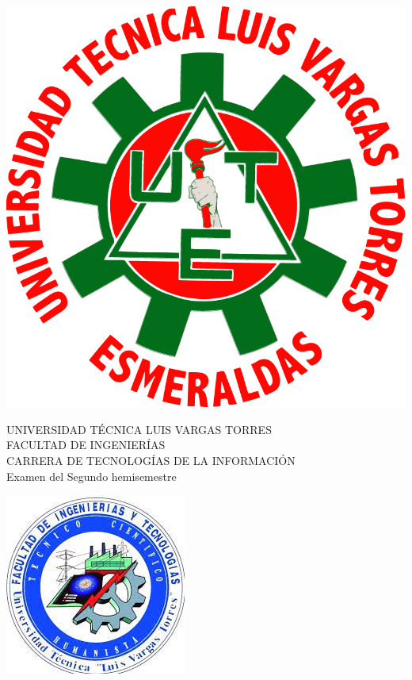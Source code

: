 \documentclass[12pt]{exam}
\begin{document}
\thispagestyle{headandfoot}


\begin{minipage}[H]{0.10\linewidth}
  \flushleft
  \includegraphics[scale=0.12]{images/logoutlvte} 
\end{minipage}
\begin{minipage}[H]{0.70\linewidth}
  \begin{center}
    UNIVERSIDAD TÉCNICA LUIS VARGAS TORRES\\  FACULTAD DE INGENIERÍAS\\
    CARRERA DE TECNOLOGÍAS DE LA INFORMACIÓN \\ Examen del Segundo hemisemestre
  \end{center}
\end{minipage}
\begin{minipage}[H]{0.10\linewidth}
    \flushleft
    \includegraphics[scale=0.3]{images/logofit}
\end{minipage}
\end{document}
